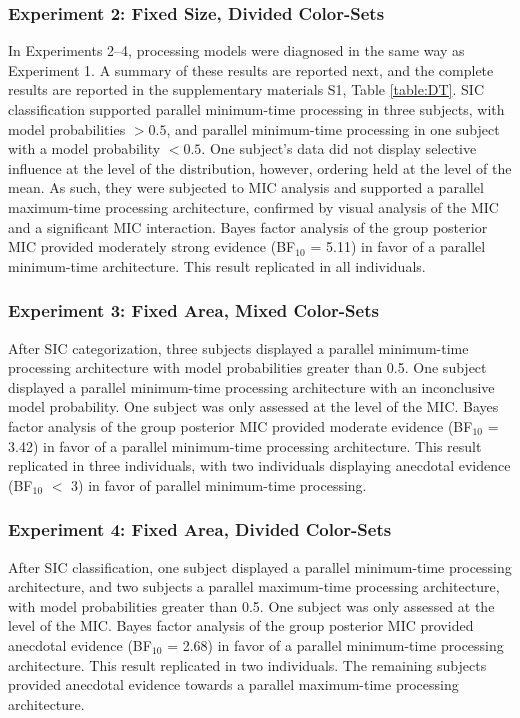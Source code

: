 \subsubsection{Experiment 2: Fixed Size, Divided Color-Sets}
In Experiments 2--4, processing models were diagnosed in the same way as Experiment 1. A summary of these results are reported next, and the complete results are reported in the supplementary materials S1, Table \ref{table:DT}. SIC classification supported parallel minimum-time processing in three subjects, with model probabilities $> 0.5$, and parallel minimum-time processing in one subject with a model probability $< 0.5$. One subject's data did not display selective influence at the level of the distribution, however, ordering held at the level of the mean. As such, they were subjected to MIC analysis and supported a parallel maximum-time processing architecture, confirmed by visual analysis of the MIC and a significant MIC interaction. Bayes factor analysis of the group posterior MIC provided moderately strong evidence (BF$_{10}$ = 5.11) in favor of a parallel minimum-time architecture. This result replicated in all individuals.

\subsubsection{Experiment 3: Fixed Area, Mixed Color-Sets}
After SIC categorization, three subjects displayed a parallel minimum-time processing architecture with model probabilities greater than 0.5. One subject displayed a parallel minimum-time processing architecture with an inconclusive model probability. One subject was only assessed at the level of the MIC. Bayes factor analysis of the group posterior MIC provided moderate evidence (BF$_{10}$ = 3.42) in favor of a parallel minimum-time processing architecture. This result replicated in three individuals, with two individuals displaying anecdotal evidence (BF$_{10}$ $<$ 3) in favor of parallel minimum-time processing.

\subsubsection{Experiment 4: Fixed Area, Divided Color-Sets}
After SIC classification, one subject displayed a parallel minimum-time processing architecture, and two subjects a parallel maximum-time processing architecture, with model probabilities greater than 0.5. One subject was only assessed at the level of the MIC. Bayes factor analysis of the group posterior MIC provided anecdotal evidence (BF$_{10}$ = 2.68) in favor of a parallel minimum-time processing architecture. This result replicated in two individuals. The remaining subjects provided anecdotal evidence towards a parallel maximum-time processing architecture. 

